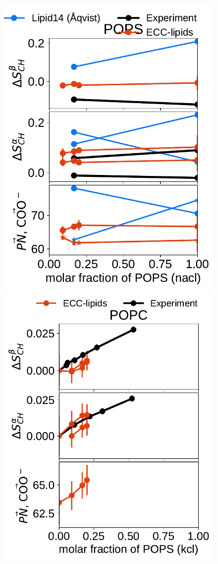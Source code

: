 \documentclass[journal=jpcbfk,manuscript=article]{achemso}
\newlength{\figwidth}
\newlength{\figwidthsmall}
\begin{document}
\begin{figure}[htb!]
  \includegraphics[width=\figwidthsmall]{../Fig/order_parameters_changes_A-B_PC-PS_mix_POPS_nacl.pdf} 
  \includegraphics[width=\figwidthsmall]{../Fig/order_parameters_changes_A-B_PC-PS_mix_POPC_kcl.pdf} 

\end{figure}
\end{document}
